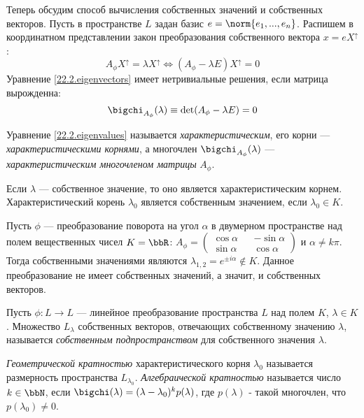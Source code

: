 Теперь обсудим способ вычисления собственных значений и собственных векторов. Пусть в пространстве $L$ задан базис $ e=\norm{e_1,...,e_n}$. Распишем в координатном представлении закон преобразования собственного вектора $x=e X^\uparrow$:
\begin{equation}\label{22.2.eigenvectors}
A_\phi X^\uparrow=\lambda X^\uparrow \Leftrightarrow (A_\phi-\lambda E)X^\uparrow=0
\end{equation}
Уравнение \ref{22.2.eigenvectors} имеет нетривиальные решения, если матрица вырожденна:
\begin{equation}\label{22.2.eigenvalues}
\bigchi_{A_\phi}(\lambda)\equiv\det(A_\phi-\lambda E)=0
\end{equation}
\begin{defn}
Уравнение \ref{22.2.eigenvalues} называется \textit{характеристическим}, его корни --- \textit{характеристическими корнями}, а многочлен $\bigchi_{A_\phi}(\lambda)$ --- \textit{характеристическим многочленом матрицы} $A_\phi$.
\end{defn}
\begin{stt}
Если $\lambda$ --- собственное значение, то оно является характеристическим корнем. Характеристический корень $\lambda_0$ является собственным значением, если $\lambda_0 \in K$.
\end{stt}
\begin{exmpl}
Пусть $\phi$ --- преобразование поворота на угол $\alpha$ в двумерном пространстве над полем вещественных чисел $K=\bbR$: $A_\phi=\begin{pmatrix}
\cos\alpha && -\sin\alpha \\ \sin\alpha && \cos\alpha
\end{pmatrix}$ и $\alpha \neq k\pi$. Тогда собственными значениями являются $\lambda_{1,2}=e^{\pm i\alpha} \notin K$. Данное преобразование не имеет собственных значений, а значит, и собственных векторов.
\end{exmpl}

\begin{defn}
Пусть $\phi:L\rightarrow L$ --- линейное преобразование пространства $L$ над полем $K$, $\lambda \in K$. Множество $L_\lambda$ собственных векторов, отвечающих собственному значению $\lambda$, называется \textit{собственным подпространством} для собственного значения $\lambda$.
\end{defn}
\begin{defn}
\textit{Геометрической кратностью} характеристического корня $\lambda_0$ называется размерность пространства $L_{\lambda_0}$.
\textit{Алгебраической кратностью} называется число $k \in \bbN$, если $\bigchi(\lambda)=(\lambda-\lambda_0)^k p(\lambda)$, где $p(\lambda)$ - такой многочлен, что $p(\lambda_0) \neq 0$.
\end{defn}

